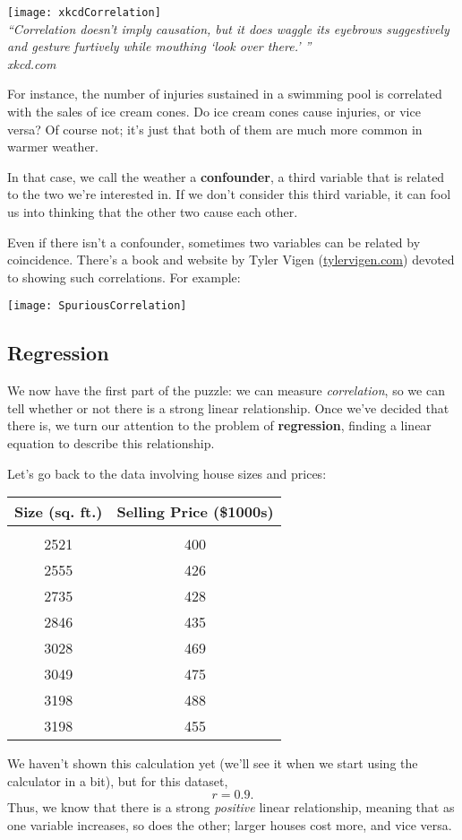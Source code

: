 \begin{center}
\texttt{[image: xkcdCorrelation]}\\
\emph{\small ``Correlation doesn't imply causation, but it does waggle its eyebrows suggestively and gesture furtively while mouthing `look over there.' ''}\\
\hfill \emph{\small xkcd.com}
\end{center}

For instance, the number of injuries sustained in a swimming pool is correlated with the sales of ice cream cones.  Do ice cream cones cause injuries, or vice versa?  Of course not; it's just that both of them are much more common in warmer weather.

In that case, we call the weather a \textbf{confounder}, a third variable that is related to the two we're interested in.  If we don't consider this third variable, it can fool us into thinking that the other two cause each other.\\
\pagebreak

Even if there isn't a confounder, sometimes two variables can be related by coincidence.  There's a book and website by Tyler Vigen (\href{http://tylervigen.com/spurious-correlations}{tylervigen.com}) devoted to showing such correlations.  For example:
\begin{center}
\texttt{[image: SpuriousCorrelation]}
\end{center}

\subsection{Regression}
We now have the first part of the puzzle: we can measure \emph{correlation}, so we can tell whether or not there is a strong linear relationship.  Once we've decided that there is, we turn our attention to the problem of \textbf{regression}, finding a linear equation to describe this relationship.

Let's go back to the data involving house sizes and prices:
\begin{center}
\begin{tabular}{c c}
\textbf{Size (sq. ft.)} & \textbf{Selling Price (\$1000s)}\\
\hline
& \\
2521 & 400\\
2555 & 426\\
2735 & 428\\
2846 & 435\\
3028 & 469\\
3049 & 475\\
3198 & 488\\
3198 & 455\\
\end{tabular}
\end{center}
We haven't shown this calculation yet (we'll see it when we start using the calculator in a bit), but for this dataset, \[r = 0.9.\]  Thus, we know that there is a strong \emph{positive} linear relationship, meaning that as one variable increases, so does the other; larger houses cost more, and vice versa.

